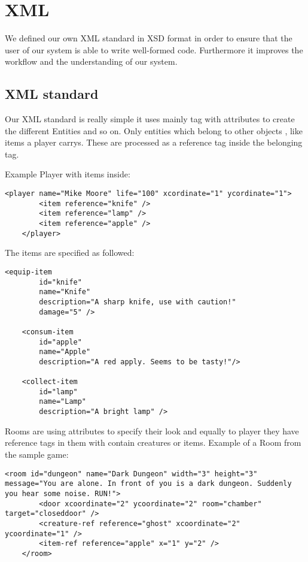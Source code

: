 \chapter{XML}

We defined our own XML standard in XSD format in order to ensure that the user of our system is able to write well-formed code. Furthermore it improves the workflow and the understanding of our system. 

\section{XML standard}
Our XML standard is really simple it uses mainly tag with attributes to create the different Entities and so on. Only entities which belong to other objects , like items a player carrys. These are processed as a reference tag inside the belonging tag.

Example Player with items inside:
\lstset{language=XML}
\begin{lstlisting}
<player name="Mike Moore" life="100" xcordinate="1" ycordinate="1">
        <item reference="knife" />
        <item reference="lamp" />
        <item reference="apple" />
    </player>
\end{lstlisting}
The items are specified as followed:
\lstset{language=XML}
\begin{lstlisting}
<equip-item
        id="knife"
        name="Knife"
        description="A sharp knife, use with caution!"
        damage="5" />

    <consum-item
        id="apple"
        name="Apple"
        description="A red apply. Seems to be tasty!"/>

    <collect-item
        id="lamp"
        name="Lamp"
        description="A bright lamp" />
\end{lstlisting}

Rooms are using attributes to specify their look and equally to player they have reference tags in them with contain creatures or items.
Example of a Room from the sample game:
\lstset{language=XML}
\begin{lstlisting}
<room id="dungeon" name="Dark Dungeon" width="3" height="3" message="You are alone. In front of you is a dark dungeon. Suddenly you hear some noise. RUN!">
        <door xcoordinate="2" ycoordinate="2" room="chamber" target="closeddoor" />
        <creature-ref reference="ghost" xcoordinate="2" ycoordinate="1" />
        <item-ref reference="apple" x="1" y="2" />
    </room>

\end{lstlisting}


